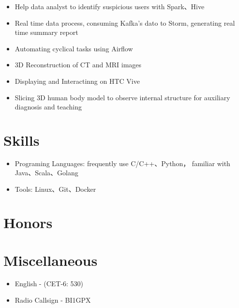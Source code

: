 \documentclass{resume}
\begin{document}
\begin{itemize}[topsep = 0 pt, partopsep = 0pt]
  \item Help data analyst to identify suspicious users with Spark、Hive
  \item Real time data process, consuming Kafka's dato to Storm, generating real time summary report
  \item Automating cyclical tasks using Airflow 
\end{itemize}

\begin{itemize}[topsep = 0 pt, partopsep = 0pt]
  \item 3D Reconstruction of CT and MRI images
  \item Displaying and Interactinng on HTC Vive
  \item Slicing 3D human body model to observe internal structure for auxiliary  diagnosis and teaching
\end{itemize}

\section{ Skills}
\begin{itemize}[parsep=0.5ex]
  \item Programing Languages: frequently use  C/C++、Python， familiar with  Java、Scala、Golang
  \item Tools: Linux、Git、Docker
\end{itemize}

\section{ Honors}

\section{ Miscellaneous}
\begin{itemize}[parsep=0.5ex]
  \item  English - (CET-6: 530)
  \item  Radio Callsign - BI1GPX
\end{itemize}
\end{document}
